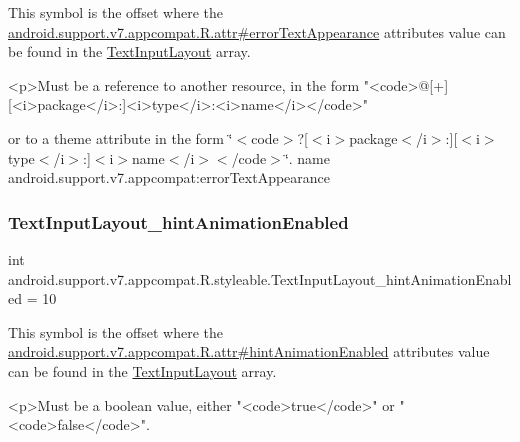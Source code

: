 This symbol is the offset where the \hyperlink{classandroid_1_1support_1_1v7_1_1appcompat_1_1R_1_1attr_a3eeafb095dc2fd2d478b56b33313af0b}{android.\+support.\+v7.\+appcompat.\+R.\+attr\#error\+Text\+Appearance} attribute\textquotesingle{}s value can be found in the \hyperlink{classandroid_1_1support_1_1v7_1_1appcompat_1_1R_1_1styleable_a618db13ebe8aab96f9d951a0d1c7d5bc}{Text\+Input\+Layout} array.

\begin{DoxyVerb}      <p>Must be a reference to another resource, in the form "<code>@[+][<i>package</i>:]<i>type</i>:<i>name</i></code>"
\end{DoxyVerb}
 or to a theme attribute in the form \char`\"{}$<$code$>$?\mbox{[}$<$i$>$package$<$/i$>$\+:\mbox{]}\mbox{[}$<$i$>$type$<$/i$>$\+:\mbox{]}$<$i$>$name$<$/i$>$$<$/code$>$\char`\"{}.  name android.\+support.\+v7.\+appcompat\+:error\+Text\+Appearance \mbox{\label{classandroid_1_1support_1_1v7_1_1appcompat_1_1R_1_1styleable_a251daf99133a0fb31843185d95f33d0d}} 
\subsubsection{\texorpdfstring{Text\+Input\+Layout\+\_\+hint\+Animation\+Enabled}{TextInputLayout\_hintAnimationEnabled}}
{\footnotesize\ttfamily int android.\+support.\+v7.\+appcompat.\+R.\+styleable.\+Text\+Input\+Layout\+\_\+hint\+Animation\+Enabled = 10\hspace{0.3cm}{\ttfamily [static]}}

This symbol is the offset where the \hyperlink{classandroid_1_1support_1_1v7_1_1appcompat_1_1R_1_1attr_ae3ff8656ab6c146f92c9e92940809add}{android.\+support.\+v7.\+appcompat.\+R.\+attr\#hint\+Animation\+Enabled} attribute\textquotesingle{}s value can be found in the \hyperlink{classandroid_1_1support_1_1v7_1_1appcompat_1_1R_1_1styleable_a618db13ebe8aab96f9d951a0d1c7d5bc}{Text\+Input\+Layout} array.

\begin{DoxyVerb}      <p>Must be a boolean value, either "<code>true</code>" or "<code>false</code>".
\end{DoxyVerb}
 

